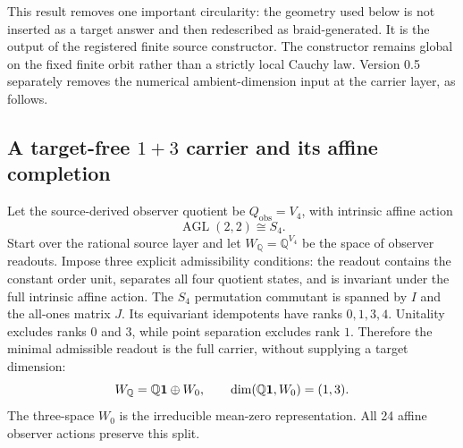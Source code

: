 This result removes one important circularity: the geometry used below is not inserted as a target answer and then redescribed as braid-generated. It is the output of the registered finite source constructor. The constructor remains global on the fixed finite orbit rather than a strictly local Cauchy law. Version 0.5 separately removes the numerical ambient-dimension input at the carrier layer, as follows.

\subsection{A target-free $1+3$ carrier and its affine completion}

Let the source-derived observer quotient be $Q_{\mathrm{obs}}=V_4$, with intrinsic affine action
\[
 \operatorname{AGL}(2,2)\cong S_4.
\]
Start over the rational source layer and let $W_{\mathbb Q}=\mathbb Q^{V_4}$ be the space of observer readouts. Impose three explicit admissibility conditions: the readout contains the constant order unit, separates all four quotient states, and is invariant under the full intrinsic affine action. The $S_4$ permutation commutant is spanned by $I$ and the all-ones matrix $J$. Its equivariant idempotents have ranks $0,1,3,4$. Unitality excludes ranks $0$ and $3$, while point separation excludes rank $1$. Therefore the minimal admissible readout is the full carrier, without supplying a target dimension:
\begin{equation}\label{eq:source13}
 W_{\mathbb Q}=\mathbb Q\mathbf{1}\oplus W_0,
 \qquad \dim(\mathbb Q\mathbf{1},W_0)=(1,3).
\end{equation}
The three-space $W_0$ is the irreducible mean-zero representation. All 24 affine observer actions preserve this split.

